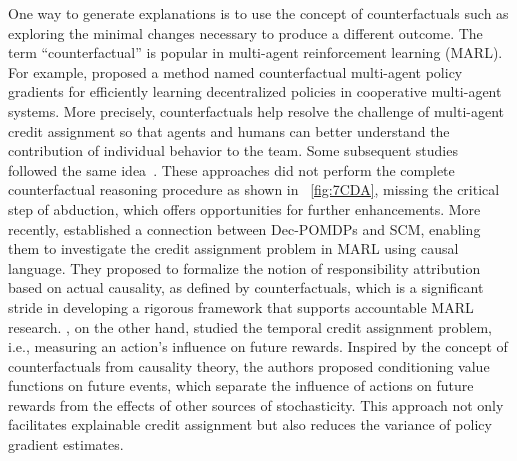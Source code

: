 \documentclass[10pt]{article} %
\theoremstyle{definition}
\begin{document}
One way to generate explanations is to use the concept of counterfactuals such as exploring the minimal changes necessary to produce a different outcome. The term ``counterfactual'' is popular in multi-agent reinforcement learning (MARL). 
For example, \citet{foersterCounterfactualMultiagentPolicy2018} proposed a method named counterfactual multi-agent policy gradients for efficiently learning decentralized policies in cooperative multi-agent systems. More precisely, counterfactuals help resolve the challenge of multi-agent credit assignment so that agents and humans can better understand the contribution of individual behavior to the team. Some subsequent studies followed the same idea~\citep{suCounterfactualMultiAgentReinforcement2020a, zhouPACAssistedValue2022a}. These approaches did not perform the complete counterfactual reasoning procedure as shown in \figurename~\ref{fig:7CDA}, missing the critical step of abduction, which offers opportunities for further enhancements. 
More recently, \citet{triantafyllouActualCausalityResponsibility2022a} established a connection between Dec-POMDPs and SCM, enabling them to investigate the credit assignment problem in MARL using causal language. They proposed to formalize the notion of responsibility attribution based on actual causality, as defined by counterfactuals, which is a significant stride in developing a rigorous framework that supports accountable MARL research. 
\citet{mesnardCounterfactualCreditAssignment2021a}, on the other hand, studied the temporal credit assignment problem, i.e., measuring an action’s influence on future rewards. Inspired by the concept of counterfactuals from causality theory, the authors proposed conditioning value functions on future events, which separate the influence of actions on future rewards from the effects of other sources of stochasticity.  This approach not only facilitates explainable credit assignment but also reduces the variance of policy gradient estimates.
\end{document}
